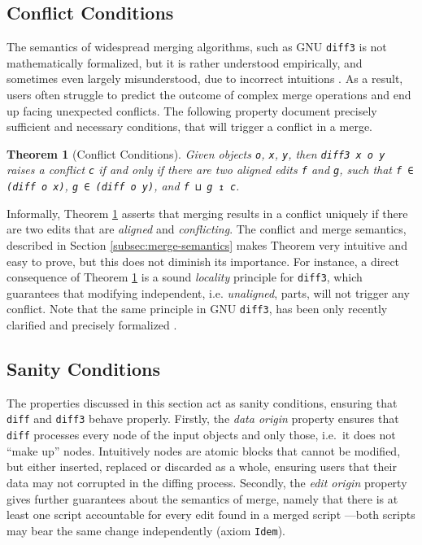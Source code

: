 \documentclass{sigplanconf}
\theoremstyle{plain}
\newtheorem{thm}{Theorem}
\begin{document}
\subsection{Conflict Conditions}
The semantics of widespread merging algorithms, such as GNU
\texttt{diff3} is not mathematically formalized, but it is rather
understood empirically, and sometimes even largely misunderstood, due
to incorrect intuitions \cite{PierceDiff3}.
%
As a result, users often struggle to predict the outcome of complex
merge operations and end up facing unexpected conflicts.
%
The following property document precisely sufficient and necessary
conditions, that will trigger a conflict in a merge.
%
\begin{thm}[Conflict Conditions]
\label{thm:conflict-conds}
  Given objects \texttt{o}, \texttt{x}, \texttt{y}, 
  then \texttt{diff3 x o y} raises a conflict \texttt{c} if and only if
  there are two aligned edits \texttt{f} and \texttt{g}, such that
  \texttt{f ∈ (diff o x)}, \texttt{g ∈ (diff o y)}, and \texttt{f ⊔ g ↥ c}.
\end{thm}
Informally, Theorem \ref{thm:conflict-conds} asserts that merging
results in a conflict uniquely if there are two edits that are
\emph{aligned} and \emph{conflicting}.
%
The conflict and merge semantics, described in Section
\ref{subsec:merge-semantics} makes Theorem very intuitive and easy to
prove, but this does not diminish its importance.
%
For instance, a direct consequence of Theorem \ref{thm:conflict-conds}
is a sound \emph{locality} principle for \texttt{diff3}, which
guarantees that modifying independent, i.e. \emph{unaligned}, parts,
will not trigger any conflict.
%
Note that the same principle in GNU \texttt{diff3}, has been only
recently clarified and precisely formalized \cite{PierceDiff3}.

\subsection{Sanity Conditions}
The properties discussed in this section act as sanity conditions,
ensuring that \texttt{diff} and \texttt{diff3} behave properly.
%
Firstly, the \emph{data origin} property ensures that \texttt{diff}
processes every node of the input objects and only those, i.e.\ it
does not ``make up'' nodes.
%
Intuitively nodes are atomic blocks that cannot be modified, but
either inserted, replaced or discarded as a whole, ensuring users that
their data may not corrupted in the diffing process.
%
Secondly, the \emph{edit origin} property gives further guarantees
about the semantics of merge, namely that there is at least one script
accountable for every edit found in a merged script ---both scripts
may bear the same change independently (axiom \texttt{Idem}).
%
%
\end{document}
